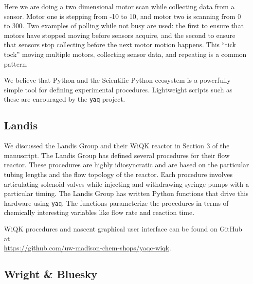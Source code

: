 \documentclass[11pt, full]{article}
\newcommand\yaq{\texttt{yaq}}
\begin{document}
Here we are doing a two dimensional motor scan while collecting data from a sensor.
Motor one is stepping from -10 to 10, and motor two is scanning from 0 to 300.
Two examples of polling while not busy are used: the first to ensure that motors have stopped moving before sensors acquire, and the second to ensure that sensors stop collecting before the next motor motion happens.
This ``tick tock'' moving multiple motors, collecting sensor data, and repeating is a common pattern.

We believe that Python and the Scientific Python ecosystem is a powerfully simple tool for defining experimental procedures.
Lightweight scripts such as these are encouraged by the \yaq{} project.

\subsection{Landis}

We discussed the Landis Group and their WiQK reactor in Section 3 of the manuscript.
The Landis Group has defined several procedures for their flow reactor.
These procedures are highly idiosyncratic and are based on the particular tubing lengths and the flow topology of the reactor.
Each procedure involves articulating solenoid valves while injecting and withdrawing syringe pumps with a particular timing.
The Landis Group has written Python functions that drive this hardware using \yaq{}.
The functions parameterize the procedures in terms of chemically interesting variables like flow rate
and reaction time.

WiQK procedures and nascent graphical user interface can be found on GitHub at \\ \url{https://github.com/uw-madison-chem-shops/yaqc-wiqk}.

\subsection{Wright \& Bluesky}
\end{document}
